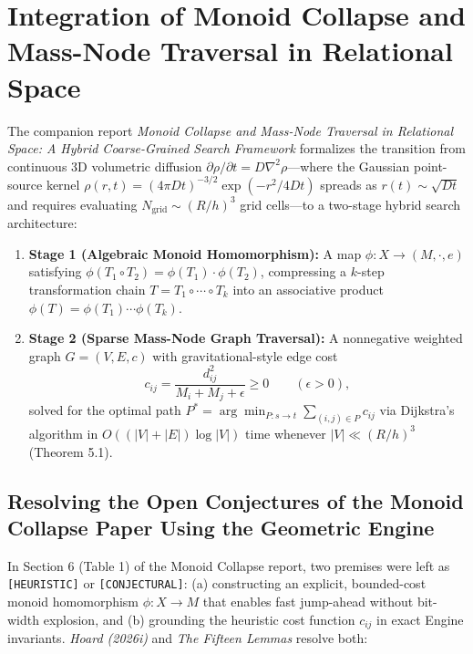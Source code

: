 \documentclass[11pt, a4paper]{article}
\begin{document}
\section{Integration of Monoid Collapse and Mass-Node Traversal in Relational Space}

The companion report \textit{Monoid Collapse and Mass-Node Traversal in Relational Space: A Hybrid Coarse-Grained Search Framework} formalizes the transition from continuous 3D volumetric diffusion $\partial\rho/\partial t = D\nabla^2\rho$—where the Gaussian point-source kernel $\rho(r,t) = (4\pi Dt)^{-3/2}\exp(-r^2/4Dt)$ spreads as $r(t) \sim \sqrt{Dt}$ and requires evaluating $N_{\text{grid}} \sim (R/h)^3$ grid cells—to a two-stage hybrid search architecture:
\begin{enumerate}
    \item \textbf{Stage 1 (Algebraic Monoid Homomorphism):} A map $\phi: X \to (M, \cdot, e)$ satisfying $\phi(T_1 \circ T_2) = \phi(T_1) \cdot \phi(T_2)$, compressing a $k$-step transformation chain $T = T_1 \circ \cdots \circ T_k$ into an associative product $\phi(T) = \phi(T_1)\cdots\phi(T_k)$.
    \item \textbf{Stage 2 (Sparse Mass-Node Graph Traversal):} A nonnegative weighted graph $G = (V, E, c)$ with gravitational-style edge cost
    \begin{equation}
    c_{ij} = \frac{d_{ij}^2}{M_i + M_j + \epsilon} \ge 0 \qquad (\epsilon > 0),
    \end{equation}
    solved for the optimal path $P^* = \arg\min_{P: s \to t} \sum_{(i,j)\in P} c_{ij}$ via Dijkstra's algorithm in $O((|V|+|E|)\log|V|)$ time whenever $|V| \ll (R/h)^3$ (Theorem 5.1).
\end{enumerate}

\subsection{Resolving the Open Conjectures of the Monoid Collapse Paper Using the Geometric Engine}
In Section 6 (Table 1) of the Monoid Collapse report, two premises were left as \texttt{[HEURISTIC]} or \texttt{[CONJECTURAL]}: (a) constructing an explicit, bounded-cost monoid homomorphism $\phi: X \to M$ that enables fast jump-ahead without bit-width explosion, and (b) grounding the heuristic cost function $c_{ij}$ in exact Engine invariants. \textit{Hoard (2026i)} and \textit{The Fifteen Lemmas} resolve both:
\end{document}
